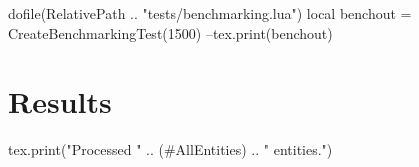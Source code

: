 \documentclass[oneside]{memoir}
\begin{document}
\pagestyle{empty}

\begin{luacode*}
	dofile(RelativePath .. "tests/benchmarking.lua")
	local benchout = CreateBenchmarkingTest(1500)
	--tex.print(benchout)
\end{luacode*}

\chapter*{Results}

\begin{luacode*}
	tex.print("Processed " .. (#AllEntities) .. " entities.")
\end{luacode*}

\PrintRpgTexErrors

\PrintRpgTexBenchmarking
\end{document}
